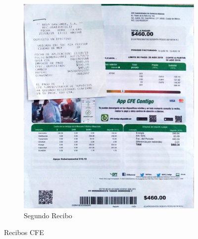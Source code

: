\documentclass[]{article}
\begin{document}
\begin{figure}[h!]
\begin{subfigure}[b]{0.45\textwidth}
		\includegraphics[width=\textwidth]{CFE2}
		\caption{Segundo Recibo}
		\label{fig:CFE2}
	\end{subfigure}
	\caption{Recibos CFE}\label{fig:recibos}
\end{figure}






%
		
\end{document}
